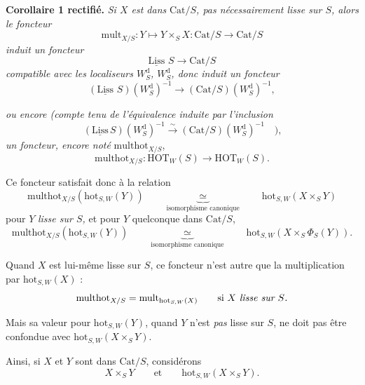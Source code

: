 \documentclass[11pt]{article}
\newcommand{\printedpage}[1]{\marginpar{\footnotesize p.~#1}}
\newcommand{\msp}[1]{\marginpar{\footnotesize [#1]}}
\newcommand{\HOT}{\mathrm{HOT}}
\newcommand{\hot}{\mathrm{hot}}
\newcommand{\Cat}{\mathrm{Cat}}
\newcommand{\Liss}{\underline{\mathrm{Liss}}\,}
\newcommand{\multhot}{\mathrm{multhot}}
\newcommand{\mult}{\mathrm{mult}}
\begin{document}
\textbf{Corollaire 1 rectifié.} \textit{Si $X$ est dans} $\Cat/S$\textit{, pas nécessairement lisse sur $S$, alors le foncteur}
\[\mult_{X/S} : Y\longmapsto Y\times_S X : \Cat/S\longrightarrow \Cat/S\]
\textit{induit un foncteur}
\[\Liss\,S\longrightarrow \Cat/S\]
\textit{compatible avec les localiseurs $W_S^{\mathrm{d}}$, $W_S^{\mathrm{d}}$, donc induit un foncteur}
\[(\Liss\,S)(W_S^{\mathrm{d}})^{-1}\longrightarrow(\Cat/S)(W_S^{\mathrm{d}})^{-1},\]

\msp{155}
\textit{ou encore (compte tenu de l'équivalence induite par l'inclusion}
\[(\underline{\mathrm{Liss}}\,S)(W_S^{\mathrm{d}})^{-1}\xrightarrow{\ \sim\ }(\Cat/S)(W_S^{\mathrm{d}})^{-1}\quad\textit{),}\] %
\textit{un foncteur, encore noté} $\multhot_{X/S}$,
\[\multhot_{X/S} : \HOT_W(S)\longrightarrow\HOT_W(S).\]

Ce foncteur satisfait donc à la relation
\[\multhot_{X/S}(\hot_{S,W}(Y))\qquad\underbrace{\ \simeq\ }_{\text{isomorphisme canonique}}\qquad\hot_{S,W}(X\times_S Y)\]
\printedpage{95}
pour $Y$ \textit{lisse sur $S$,} et pour $Y$ quelconque dans $\Cat/S$,
\[\multhot_{X/S}(\hot_{S,W}(Y))\qquad\underbrace{\ \simeq\ }_{\text{isomorphisme canonique}}\qquad\hot_{S,W}(X\times_S \Phi_S(Y)).\]

Quand $X$ est lui-même lisse sur $S$, ce foncteur n'est autre que la multiplication par $\hot_{S,W}(X)$ :
\[\multhot_{X/S}=\mult_{\hot_{S,W}(X)}\qquad\text{si $X$ \textit{lisse sur $S$.}}\]

Mais sa valeur pour $\hot_{S,W}(Y)$, quand $Y$ n'est \textit{pas} lisse sur $S$, ne doit pas être confondue avec $\hot_{S,W}(X\times_S Y)$.

Ainsi, si $X$ et $Y$ sont dans $\Cat/S$, considérons
\[X\times_S Y\qquad\text{et}\qquad\boxed{\hot_{S,W}(X\times_S Y).}\] %
\end{document}
